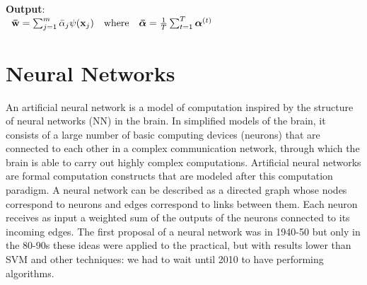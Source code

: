 \documentclass[12pt]{report}
\theoremstyle{plain}
\begin{document}
\begin{flushleft}
\begin{tcolorbox}
	\textbf{Output}:\\
	\-\ \qquad $\vb{\bar{w}}=\sum_{j=1}^m\bar{\alpha}_j\psi(\vb{x}_j) \quad\text{where}\quad \bm{\bar{\alpha}}=\frac{1}{T}\sum_{t=1}^T\bm{\alpha}^{(t)}$
	
	\label{box:kernels_for_Soft_SVM}
\end{tcolorbox}



\chapter{Neural Networks}
An artificial neural network is a model of computation inspired by the structure of neural networks (NN) in the brain. In simplified models of the brain, it consists of a large number of basic computing devices (neurons) that are connected to each other in a complex communication network, through which the brain is able to carry out highly complex computations. Artificial neural networks are formal computation constructs that are modeled after this computation paradigm. A neural network can be described as a directed graph whose nodes correspond to neurons and edges correspond to links between them. Each neuron receives as input a weighted sum of the outputs of the neurons connected to its incoming edges. The first proposal of a neural network was in 1940-50 but only in the 80-90s these ideas were applied to the practical, but with results lower than SVM and other techniques: we had to wait until 2010 to have performing algorithms.


\end{flushleft}
\end{document}
